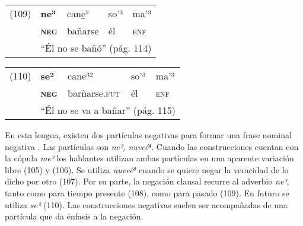 {%
\begin{tabular}{lllll}
(109) & \textbf{ne³} & cane̱² & so'³ & ma'³ \\
& \textsc{\textbf{neg}} & bañarse & él & \textsc{enf} \\
& \multicolumn{4}{l}{``Él no se bañó'' (pág. 114)}
\end{tabular} \vspace{0.3cm}

\begin{tabular}{lllll}
(110) & \textbf{se²} & cane³² & so'³ & ma'³ \\
& \textsc{\textbf{neg}} & barñarse.\textsc{fut} & él & \textsc{enf} \\
& \multicolumn{4}{l}{``Él no se va a bañar'' (pág. 115)}
\end{tabular} \vspace{0.5cm}

}

En esta lengua, existen dos partículas negativas para formar una frase nominal negativa \textcolor{MidnightBlue}{\citep{Triqui}}. Las partículas son {\setmainfont{Charis SIL} \textit{ne³, nuveé⁴}}. Cuando las construcciones cuentan con la cópula {\setmainfont{Charis SIL} \textit{me³}} los hablantes utilizan ambas partículas en una aparente variación libre (105) y (106). Se utiliza {\setmainfont{Charis SIL} \textit{nuveé⁴}} cuando se quiere negar la veracidad de lo dicho por otro (107). Por su parte, la negación clausal recurre al adverbio {\setmainfont{Charis SIL} \textit{ne³}}, tanto como para tiempo presente (108), como para pasado (109). En futuro se utiliza {\setmainfont{Charis SIL} \textit{se²}} (110). Las construcciones negativas suelen ser acompañadas de una partícula que da énfasis a la negación.